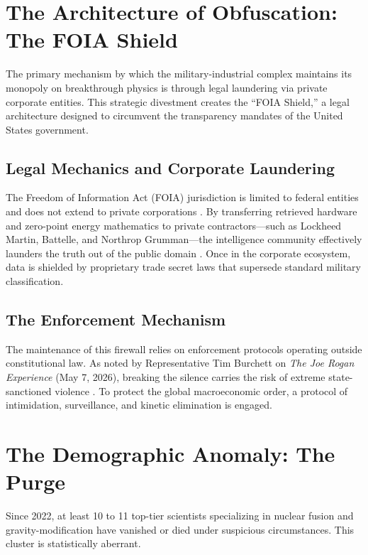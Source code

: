 \documentclass[11pt,a4paper]{article}
\begin{document}
\section{The Architecture of Obfuscation: The FOIA Shield}
The primary mechanism by which the military-industrial complex maintains its monopoly on breakthrough physics is through legal laundering via private corporate entities. This strategic divestment creates the ``FOIA Shield,'' a legal architecture designed to circumvent the transparency mandates of the United States government.

\subsection{Legal Mechanics and Corporate Laundering}\label{sec:legal-mechanics}
The Freedom of Information Act (FOIA) jurisdiction is limited to federal entities and does not extend to private corporations \cite{FS-1}. By transferring retrieved hardware and zero-point energy mathematics to private contractors—such as Lockheed Martin, Battelle, and Northrop Grumman—the intelligence community effectively launders the truth out of the public domain \cite{FS-1, CI-1, CI-2}. Once in the corporate ecosystem, data is shielded by proprietary trade secret laws that supersede standard military classification.

\subsection{The Enforcement Mechanism}\label{sec:enforcement}
The maintenance of this firewall relies on enforcement protocols operating outside constitutional law. As noted by Representative Tim Burchett on \textit{The Joe Rogan Experience} (May 7, 2026), breaking the silence carries the risk of extreme state-sanctioned violence \cite{LE-1}. To protect the global macroeconomic order, a protocol of intimidation, surveillance, and kinetic elimination is engaged.

\section{The Demographic Anomaly: The Purge}
Since 2022, at least 10 to 11 top-tier scientists specializing in nuclear fusion and gravity-modification have vanished or died under suspicious circumstances. This cluster is statistically aberrant.
\end{document}
